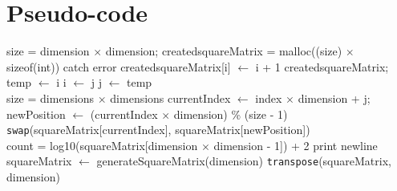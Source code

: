\documentclass[10pt,twocolumn]{witseiepaper}
\begin{document}




\newpage
\onecolumn
{}
\setcounter{page}{1}
\begin{appendix} \label{sec:appendix}
	
\section{Pseudo-code}

\begin{algorithm}[htbp]
	\begin{algorithmic}
		
		\State size = dimension $\times$ dimension;
		\State created\textunderscore squareMatrix = malloc((size) $\times$ sizeof(int))
		\State catch error
		\EndIf
		\State created\textunderscore squareMatrix[i] $\leftarrow$ i + 1
		\EndFor
		\State \Return created\textunderscore squareMatrix; 
		\EndFunction \\
		
		\State temp $\leftarrow$ i
		\State i $\leftarrow$ j
		\State j $\leftarrow$ temp
		\EndFunction \\
		
		\State size = dimensions $\times$ dimensions
		\State currentIndex $\leftarrow$ index $\times$ dimension + j;
		\State newPosition $\leftarrow$ (currentIndex $\times$ dimension) \% (size - 1)
		\EndFor
		\EndFor
		\State \verb|swap|(squareMatrix[currentIndex], squareMatrix[newPosition])
		\EndFunction \\
		
		\State count = log10(squareMatrix[dimension $\times$ dimension - 1]) + 2
		\State print newline
		\EndIf
		\EndFor
		\EndFunction \\
		
		\State squareMatrix $\leftarrow$ generateSquareMatrix(dimension)
		\State \verb|transpose|(squareMatrix, dimension)
		\EndFunction \\
		

\end{algorithmic}
\end{algorithm}
\end{appendix}
\end{document}
